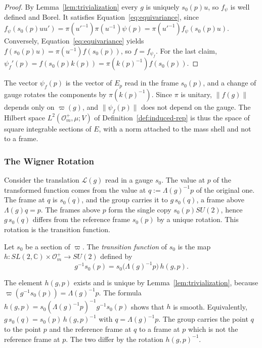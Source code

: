 \begin{proof}
	By Lemma~\ref{lem:trivialization} every $g$ is uniquely $s_0(p)u$, so $f_\psi$ is well defined and Borel. It satisfies Equation~\eqref{eq:equivariance}, since $f_\psi(s_0(p)uu')=\pi(u'^{-1})\pi(u^{-1})\psi(p)=\pi(u'^{-1})f_\psi(s_0(p)u)$. Conversely, Equation~\eqref{eq:equivariance} yields $f(s_0(p)u)=\pi(u^{-1})f(s_0(p))$, so $f=f_{\psi_f}$. For the last claim, $\psi_f'(p)=f(s_0(p)k(p))=\pi(k(p)^{-1})f(s_0(p))$.
\end{proof}

\begin{remark}
	The vector $\psi_f(p)$ is the vector of $E_p$ read in the frame $s_0(p)$, and a change of gauge rotates the components by $\pi(k(p)^{-1})$. Since $\pi$ is unitary, $\|f(g)\|$ depends only on $\varpi(g)$, and $\|\psi_f(p)\|$ does not depend on the gauge. The Hilbert space $L^2(\mathcal{O}_m^+,\mu;V)$ of Definition~\ref{def:induced-rep} is thus the space of square integrable sections of $E$, with a norm attached to the mass shell and not to a frame.
\end{remark}

\subsubsection*{The Wigner Rotation}

Consider the translation $\mathcal{L}(g)$ read in a gauge $s_0$. The value at $p$ of the transformed function comes from the value at $q:=\Lambda(g)^{-1}p$ of the original one. The frame at $q$ is $s_0(q)$, and the group carries it to $g\,s_0(q)$, a frame above $\Lambda(g)q=p$. The frames above $p$ form the single copy $s_0(p)SU(2)$, hence $g\,s_0(q)$ differs from the reference frame $s_0(p)$ by a unique rotation. This rotation is the transition function.

\begin{definition}\label{def:transition-function}
	Let $s_0$ be a section of $\varpi$. The \emph{transition function} of $s_0$ is the map $h:SL(2,\mathbb{C})\times\mathcal{O}_m^+\to SU(2)$ defined by
	\begin{equation*}
		g^{-1}s_0(p)=s_0\big(\Lambda(g)^{-1}p\big)\,h(g,p).
	\end{equation*}
\end{definition}

\begin{remark}
	The element $h(g,p)$ exists and is unique by Lemma~\ref{lem:trivialization}, because $\varpi(g^{-1}s_0(p))=\Lambda(g)^{-1}p$. The formula $h(g,p)=s_0(\Lambda(g)^{-1}p)^{-1}g^{-1}s_0(p)$ shows that $h$ is smooth. Equivalently, $g\,s_0(q)=s_0(p)\,h(g,p)^{-1}$ with $q=\Lambda(g)^{-1}p$. The group carries the point $q$ to the point $p$ and the reference frame at $q$ to a frame at $p$ which is not the reference frame at $p$. The two differ by the rotation $h(g,p)^{-1}$.
\end{remark}

